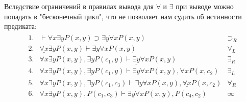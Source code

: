 \begin{example}
    Вследствие ограничений в правилах вывода для $\forall$ и $\exists$ при выводе можно попадать в "бесконечный цикл", что не позволяет нам судить об истинности предиката:
    \begin{equation*}
        \begin{array}{c}
            \begin{array}{llr}
                1.  & \vdash \forall x \exists y P(x,y) \supset \exists y \forall x P(x,y)
                    & \supset_R
                    \\
                2.  & \underline{\forall x} \exists y P(x,y) \vdash \exists y \forall x P(x,y)
                    & \forall_L
                    \\
                3.  & \forall x \exists y P(x,y), \exists y P(c_1,y)\vdash \underline{\exists y} \forall x P(x,y)
                    & \exists_R
                    \\
                4.  & \forall x \exists y P(x,y), \underline{\exists y} P(c_1,y) \vdash \exists y \forall x P(x,y), \forall x P(x,c_2)
                    & \exists_L
                    \\
                5.  & \forall x \exists y P(x,y), \exists y P(c_1,c_3)\vdash \exists y \forall x P(x,y), \underline{\forall x} P(x,c_2)
                    & \forall_R
                    \\
                6.  & \forall x \exists y P(x,y), P(c_1,c_3) \vdash \exists y \forall x P(x,y),  P(c_4,c_2)
                    & \infty
                    \\
            \end{array}
            \\
        \end{array}
    \end{equation*}
\end{example}